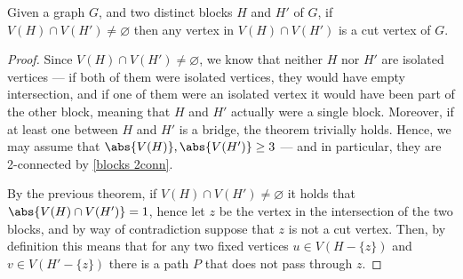 \documentclass[a4paper, 12pt]{report}
\begin{document}
    \begin{framedprop}{}
        Given a graph $G$, and two distinct blocks $H$ and $H'$ of $G$, if $V(H) \cap V(H') \neq \varnothing$ then any vertex in $V(H) \cap V(H')$ is a cut vertex of $G$.
    \end{framedprop}

    \begin{proof}
        Since $V(H) \cap V(H') \neq \varnothing$, we know that neither $H$ nor $H'$ are isolated vertices --- if both of them were isolated vertices, they would have empty intersection, and if one of them were an isolated vertex it would have been part of the other block, meaning that $H$ and $H'$ actually were a single block. Moreover, if at least one between $H$ and $H'$ is a bridge, the theorem trivially holds. Hence, we may assume that $\abs{V(H)}, \abs{V(H')} \ge 3$ --- and in particular, they are 2-connected by \cref{blocks 2conn}.

        By the previous theorem, if $V(H) \cap V(H') \neq \varnothing$ it holds that $\abs{V(H) \cap V(H')} = 1$, hence let $z$ be the vertex in the intersection of the two blocks, and by way of contradiction suppose that $z$ is not a cut vertex. Then, by definition this means that for any two fixed vertices $u \in V(H - \{z\})$ and $v \in V(H' - \{z\})$ there is a path $P$ that does not pass through $z$.

\end{proof}
\end{document}
